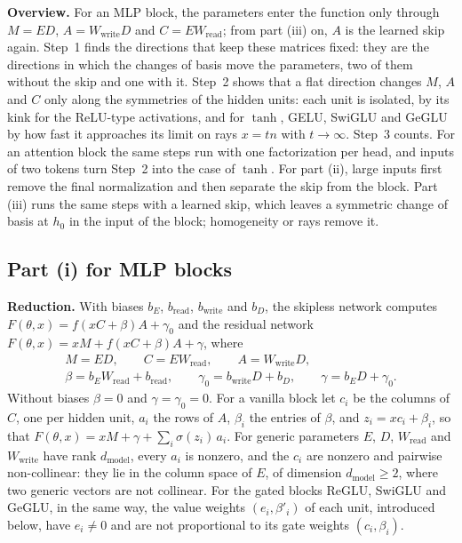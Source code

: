 \documentclass[10pt]{article}
\theoremstyle{definition}
\theoremstyle{remark}
\newcommand{\Wread}{W_{\mathrm{read}}}
\newcommand{\Wwrite}{W_{\mathrm{write}}}
\newcommand{\dm}{d_{\mathrm{model}}}
\newcommand{\para}[1]{\smallskip\noindent\textbf{#1}\hspace{0.5em}}
\begin{document}
\para{Overview.} For an MLP block, the parameters enter the function only through $M = ED$, $A = \Wwrite D$ and $C = E\Wread$; from part (iii) on, $A$ is the learned skip again. Step~1 finds the directions that keep these matrices fixed: they are the directions in which the changes of basis move the parameters, two of them without the skip and one with it. Step~2 shows that a flat direction changes $M$, $A$ and $C$ only along the symmetries of the hidden units: each unit is isolated, by its kink for the ReLU-type activations, and for $\tanh$, GELU, SwiGLU and GeGLU by how fast it approaches its limit on rays $x = tn$ with $t \to \infty$. Step~3 counts. For an attention block the same steps run with one factorization per head, and inputs of two tokens turn Step~2 into the case of $\tanh$. For part (ii), large inputs first remove the final normalization and then separate the skip from the block. Part (iii) runs the same steps with a learned skip, which leaves a symmetric change of basis at $h_0$ in the input of the block; homogeneity or rays remove it.

\subsection*{Part (i) for MLP blocks}

\para{Reduction.} With biases $b_E$, $b_{\mathrm{read}}$, $b_{\mathrm{write}}$ and $b_D$, the skipless network computes $F(\theta, x) = f(xC + \beta)A + \gamma_0$ and the residual network $F(\theta, x) = xM + f(xC + \beta)A + \gamma$, where
\begin{gather*}
M = ED,\qquad C = E\Wread,\qquad A = \Wwrite D,\\ \beta = b_E\Wread + b_{\mathrm{read}},\qquad \gamma_0 = b_{\mathrm{write}}D + b_D,\qquad \gamma = b_ED + \gamma_0 .
\end{gather*}
Without biases $\beta = 0$ and $\gamma = \gamma_0 = 0$. For a vanilla block let $c_i$ be the columns of $C$, one per hidden unit, $a_i$ the rows of $A$, $\beta_i$ the entries of $\beta$, and $z_i = xc_i + \beta_i$, so that $F(\theta, x) = xM + \gamma + \sum_i \sigma(z_i)\,a_i$. For generic parameters $E$, $D$, $\Wread$ and $\Wwrite$ have rank $\dm$, every $a_i$ is nonzero, and the $c_i$ are nonzero and pairwise non-collinear: they lie in the column space of $E$, of dimension $\dm \ge 2$, where two generic vectors are not collinear. For the gated blocks ReGLU, SwiGLU and GeGLU, in the same way, the value weights $(e_i, \beta'_i)$ of each unit, introduced below, have $e_i \neq 0$ and are not proportional to its gate weights $(c_i, \beta_i)$.
\end{document}
